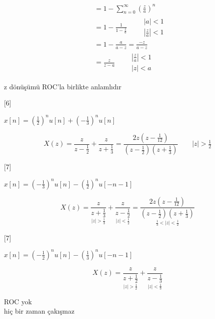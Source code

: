 \documentclass[11pt,a4paper]{article}
\begin{document}

\[ \begin{aligned}
&= 1 - \sum_{n=0}^{\infty} \left(\frac{z}{a}\right)^{n} \\
&= 1 - \frac{1}{1-\frac{z}{a}} \qquad \begin{matrix} |a|<1 \\ \left|\frac{z}{a}\right|<1 \end{matrix} \\
&= 1 - \frac{a}{a-z} = \frac{-z}{a-z} \\
&= \frac{z}{z-a} \qquad \begin{matrix} \left|\frac{z}{a}\right|<1 \\ |z|<a \end{matrix}
\end{aligned} \]

z dönüşümü ROC'la birlikte anlamlıdır

[6]

\begin{ornek}[3]
$x[n] = \left(\tfrac12\right)^{n} u[n] + \left(-\tfrac13\right)^{n} u[n]$
\end{ornek}

\[ X(z) = \frac{z}{z-\frac12} + \frac{z}{z+\frac13} = \frac{2z\left(z-\frac{1}{12}\right)}{\left(z-\frac12\right)\left(z+\frac13\right)} \qquad |z|>\tfrac12 \]

[7]

\begin{ornek}[4]
$x[n] = \left(-\tfrac13\right)^{n} u[n] - \left(\tfrac12\right)^{n} u[-n-1]$
\end{ornek}

\[ X(z) = \underset{|z|>\frac13}{\frac{z}{z+\frac13}} + \underset{|z|<\frac12}{\frac{z}{z-\frac12}} = \underset{\frac13<|z|<\frac12}{\frac{2z\left(z-\frac{1}{12}\right)}{\left(z-\frac12\right)\left(z+\frac13\right)}} \]

[7]

\begin{ornek}[5]
$x[n] = \left(-\tfrac12\right)^{n} u[n] - \left(\tfrac13\right)^{n} u[-n-1]$
\end{ornek}

\[ X(z) = \underset{|z|>\frac12}{\frac{z}{z+\frac12}} + \underset{|z|<\frac13}{\frac{z}{z-\frac13}} \]

ROC yok \\
hiç bir zaman çakışmaz
\end{document}
